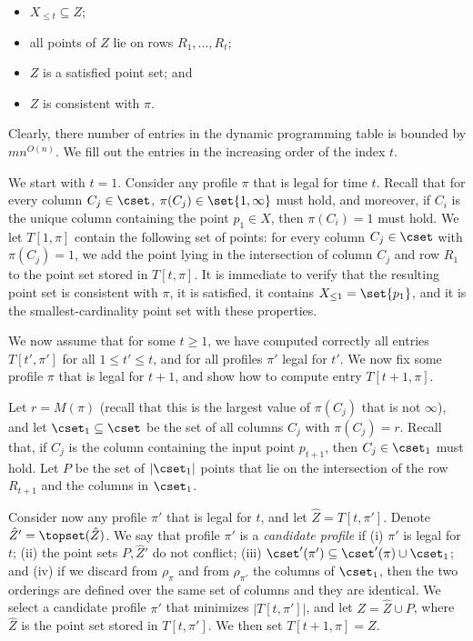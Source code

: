 \begin{itemize}
	\item $X_{\leq t}\subseteq Z$;
	\item all points of $Z$ lie on rows $R_1,\ldots, R_t$;
\item 	$Z$ is a satisfied point set; and 
\item $Z$ is consistent with $\pi$.
\end{itemize}



Clearly, there number of entries in the dynamic programming table is bounded by $m n^{O(n)}$. We fill out the entries in the increasing order of the index $t$.  

We start with $t=1$. Consider any profile $\pi$ that is legal for time $t$. Recall that for every column $C_j\in \cset$, $\pi(C_j)\in \set{1,\infty}$ must hold, and moreover, if $C_i$ is the unique column containing the point $p_1\in X$, then $\pi(C_i)=1$ must hold.
We let $T[1,\pi]$ contain the following set of points: for every column $C_j\in \cset$ with $\pi(C_j)=1$, we add the point lying in the intersection of column $C_j$ and row $R_1$ to the point set stored in $T[t,\pi]$. It is immediate to verify that the resulting point set is consistent with $\pi$, it is satisfied, it contains $X_{\leq 1}=\set{p_1}$, and it is the smallest-cardinality point set with these properties.

We now assume that for some $t\geq 1$, we have computed correctly all entries $T[t',\pi']$ for all $1\leq t'\leq t$, and for all profiles $\pi'$ legal for $t'$. We now fix some profile $\pi$ that is legal for $t+1$, and show how to compute entry $T[t+1,\pi]$.

Let $r=M(\pi)$ (recall that this is the largest value of $\pi(C_j)$ that is not $\infty$), and let $\cset_1\subseteq \cset$ be the set of all columns $C_j$ with $\pi(C_j)=r$. Recall that, if $C_j$ is the column containing the input point $p_{t+1}$, then $C_j\in \cset_1$ must hold. Let $P$ be the set of $|\cset_1|$ points that lie on the intersection of the row $R_{t+1}$ and the columns in $\cset_1$.

Consider now any profile $\pi'$ that is legal for $t$, and let $\hat Z=T[t,\pi']$. Denote $\hat Z'=\topset(\hat Z)$. We say that profile $\pi'$ is a \emph{candidate profile} if (i) $\pi'$ is legal for $t$; (ii) the point sets $P,\hat Z'$ do not conflict; (iii) $\cset'(\pi')\subseteq \cset'(\pi)\cup \cset_1$; and (iv) if we discard from $\rho_{\pi}$ and from $\rho_{\pi'}$ the columns of $\cset_1$, then the two orderings are defined over the same set of columns and they are identical. We select a candidate profile $\pi'$ that minimizes $|T[t,\pi']|$, and let $Z=\hat Z\cup P$, where $\hat Z$ is the point set stored in $T[t,\pi']$. We then set $T[t+1,\pi]=Z$.

